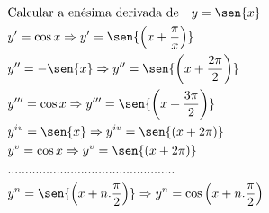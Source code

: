 \begin{ex}
\begin{align}
&\text{Calcular a enésima derivada de}\quad y=\sen{x}\nonumber\\
&y'=\cos{x} \Rightarrow y'=\sen{\left(x+\frac{\pi}{x}\right)}\nonumber\\
&y''=-\sen{x} \Rightarrow y''=\sen{\left(x+\frac{2\pi}{2}\right)}\nonumber\\
&y'''=\cos{x} \Rightarrow y'''=\sen{\left(x+\frac{3\pi}{2}\right)}\nonumber\\
&y^{iv}=\sen{x} \Rightarrow y^{iv}=\sen{(x+2\pi)}\nonumber\\
&y^{v}=\cos{x} \Rightarrow y^{v}=\sen{(x+2\pi)}\nonumber\\
&................................................\nonumber\\
&y^{n}=\sen{\left(x+n.\frac{\pi}{2}\right)} \Rightarrow y^{n}=\cos{\left(x+n.\frac{\pi}{2}\right)}\nonumber
\end{align}
\end{ex}